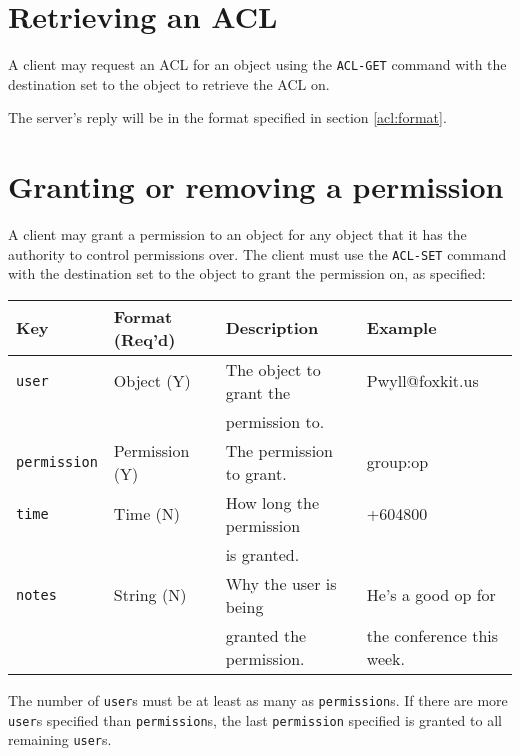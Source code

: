 \section{Retrieving an ACL}
\sectionrule

A client may request an ACL for an object using the \texttt{ACL-GET} command
with the destination set to the object to retrieve the ACL on.

The server's reply will be in the format specified in section \ref{acl:format}.



\section{Granting or removing a permission}
\sectionrule

A client may grant a permission to an object for any object that it has the
authority to control permissions over.  The client must use the \texttt{ACL-SET}
command with the destination set to the object to grant the permission on, as
specified:

\begin{tabular}{|l|l|l|l|}
  \hline
  Key                   & Format (Req'd)& Description                   & Example \\
  \hline
  \hline
  \texttt{user}         & Object (Y)    & The object to grant the       & Pwyll@foxkit.us \\
                        &               & permission to.                & \\
  \hline
  \texttt{permission}   & Permission (Y)& The permission to grant.      & group:op \\
  \hline
  \texttt{time}         & Time (N)      & How long the permission       & +604800 \\
                        &               & is granted.                   & \\
  \hline
  \texttt{notes}        & String (N)    & Why the user is being         & He's a good op for \\
                        &               & granted the permission.       & the conference this week. \\
  \hline
\end{tabular}

The number of \texttt{user}s must be at least as many as \texttt{permission}s.
If there are more \texttt{user}s specified than \texttt{permission}s, the last
\texttt{permission} specified is granted to all remaining \texttt{user}s.

